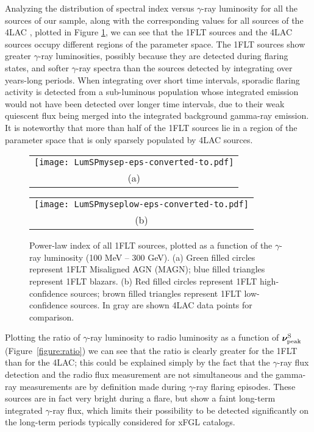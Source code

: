 \documentclass{aastex62}
\begin{document}
Analyzing the distribution of spectral index versus $\gamma$-ray luminosity for all the sources of our sample, along with the corresponding values for all sources of the 4LAC \citep{20204LAC}, plotted in Figure \ref{figure:lumsp}, we can see that the 1FLT sources and the 4LAC sources occupy different regions of the parameter space.
The 1FLT sources show greater $\gamma$-ray luminosities, possibly because they are detected during flaring states, and softer $\gamma$-ray spectra than the sources detected by integrating over years-long periods.
When integrating over short time intervals, sporadic flaring activity is detected from a sub-luminous population whose integrated emission would not have been detected over longer time intervals, due to their weak quiescent flux being merged into the integrated background gamma-ray emission.
It is noteworthy that more than half of the 1FLT sources lie in a region of the parameter space that is only sparsely populated by 4LAC sources. 


\begin{figure}[hbt!]
  \centering
  \begin{tabular}{@{}c@{}}
    \texttt{[image: LumSPmysep-eps-converted-to.pdf]} \\[\abovecaptionskip] %
    \small (a) 
  \end{tabular}


  \begin{tabular}{@{}c@{}}
    \texttt{[image: LumSPmyseplow-eps-converted-to.pdf]} \\[\abovecaptionskip] %
    \small (b) 
  \end{tabular}

  \caption{Power-law index of all 1FLT sources, plotted as a function of the $\gamma$-ray luminosity (100 MeV -- 300 GeV). (a) Green filled circles represent 1FLT Misaligned AGN (MAGN); blue filled triangles represent 1FLT blazars. (b) Red filled circles represent 1FLT high-confidence sources; brown filled triangles represent 1FLT low-confidence sources. In gray are shown 4LAC data points for comparison.}\label{figure:lumsp}
\end{figure}

Plotting the ratio of $\gamma$-ray luminosity to radio luminosity as a function of $\mathbold{\nu_{\rm peak}^{\rm S}}$ (Figure~\ref{figure:ratio}) we can see that the ratio is clearly greater for the 1FLT than for the 4LAC; this could be explained simply by the fact that the $\gamma$-ray flux detection and the radio flux measurement are not simultaneous and the gamma-ray measurements are by definition made during $\gamma$-ray flaring episodes. These sources are in fact very bright during a flare, but show a faint long-term integrated $\gamma$-ray flux, which limits their possibility to be detected significantly on the long-term periods typically considered for xFGL catalogs. 
\end{document}
